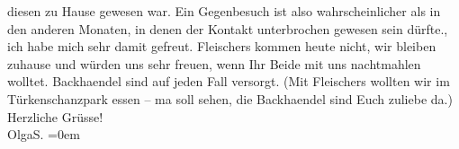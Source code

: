 \begin{ledgroupsized}[t]{13cm}
{{{                  diesen zu Hause gewesen war. Ein Gegenbesuch ist also wahrscheinlicher als in den
                  anderen Monaten, in denen der Kontakt unterbrochen gewesen sein dürfte.}}}\label{K_L02564-1h},
               ich habe mich sehr damit gefreut.\pend
           \pstart
           Fleischers kommen heute nicht, wir
               bleiben zuhause und würden uns sehr freuen, wenn Ihr Beide mit uns nachtmahlen wolltet.
               Backhaendel sind {\pb}auf jeden Fall versorgt. (Mit Fleischers wollten wir im Türkenschanzpark essen – ma soll sehen, die
               Backhaendel sind Euch zuliebe da.)\pend
           \pstart
           Herzliche Grüsse!{\\[\baselineskip]}\spacefill\mbox{OlgaS.}\pend
           \leftskip=0em{}
         
         \endnumbering{}\end{ledgroupsized}  \newcommand{\dateiname}{L02564}\newcommand{\titel}{Olga Schnitzler an Richard Beer-Hofmann, [17. 1. 1909?]}\newcommand{\editorInnen}{Martin Anton Müller und Gerd-Hermann Susen}
      